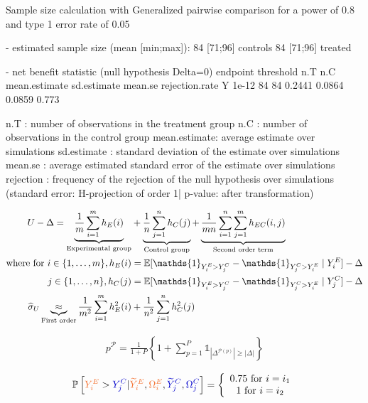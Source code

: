 \documentclass[12pt]{article}
\theoremstyle{definition}
\newcommand{\darkblue}{blue!80!black}
\begin{document}
\begin{Routput}
  Sample size calculation with Generalized pairwise comparison
  for a power of 0.8 and type 1 error rate of 0.05 

- estimated sample size (mean [min;max]): 84 [71;96] controls
                                          84 [71;96] treated

- net benefit statistic (null hypothesis Delta=0)
endpoint threshold n.T n.C mean.estimate sd.estimate mean.se rejection.rate
       Y     1e-12  84  84        0.2441      0.0864  0.0859          0.773

n.T          : number of observations in the treatment group
n.C          : number of observations in the control group
mean.estimate: average estimate over simulations
sd.estimate  : standard deviation of the estimate over simulations
mean.se      : average estimated standard error of the estimate over simulations
rejection    : frequency of the rejection of the null hypothesis over simulations
(standard error: H-projection of order 1| p-value: after transformation) 
\end{Routput}


\clearpage

\begin{align*}
	U - \Delta = \underbrace{\frac{1}{m} \sum_{i=1}^{m} h_E(i)}_{\text{Experimental group}}&  + \underbrace{\frac{1}{n} \sum_{j=1}^{n} h_C(j)}_{\text{Control group}} + \underbrace{ \frac{1}{m n}  \sum_{i=1}^{n}\sum_{j=1}^{m} h_{EC}(i,j)}_{\text{Second order term}} \notag \\
	\text{where for } i \in \{1,\ldots,m\}, h_E(i)&=\mathbb{E}[\mathds{1}_{Y^E_i > Y^C_j} - \mathds{1}_{Y^C_j > Y^E_i}\mid Y^E_i] - \Delta \notag \\
	j \in \{1,\ldots,n\}, h_C(j)&=\mathbb{E}[\mathds{1}_{Y^E_i > Y^C_j} - \mathds{1}_{Y^C_j > Y^E_i}\mid Y^C_j] - \Delta \notag  \\
 \widehat{\sigma}_{U} \underbrace{\approx}_{\text{First order}} \frac{1}{m^2} \sum_{i=1}^m h^2_E(i) &+ \frac{1}{n^2} \sum_{j=1}^n h^2_C(j)
\end{align*}

\begin{align*}
	p^{\mathcal{P}} = \frac{1}{1+P} \left\{1+\sum_{p=1}^P \mathds{1}_{\left| \Delta^{\mathcal{P}(p)}\right| \geq \left|\Delta \right|} \right\}
\end{align*}

\begin{align*}	\mathbb{P}\left[\textcolor{Orange}{Y^E_{i}}>\textcolor{\darkblue}{Y^C_{j}}|\textcolor{Orange}{\widetilde{Y}^E_{i}},\textcolor{Orange}{\Omega^E_i},\textcolor{\darkblue}{\widetilde{Y}^C_{j}},\textcolor{\darkblue}{\Omega^C_j}\right] = \left\{\begin{array}{c}
		0.75 \text{ for } i=i_1 \\
		1 \text{ for } i=i_2
	\end{array}\right.
\end{align*}
\end{document}
